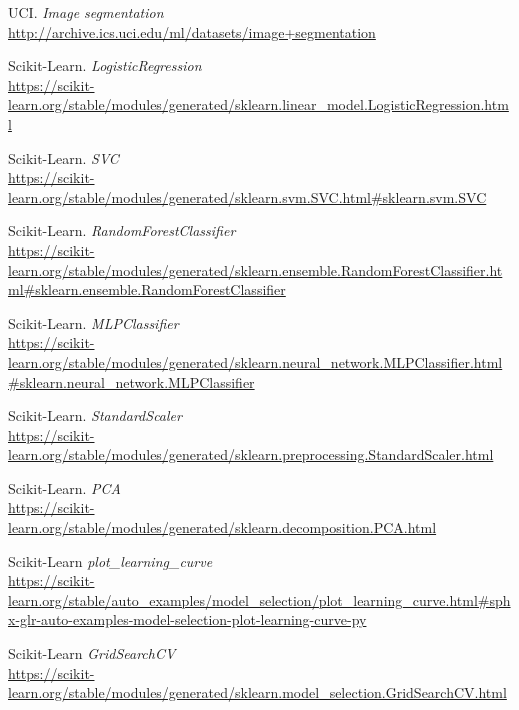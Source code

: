 \documentclass[11pt,a4paper]{article}
\begin{document}
\newpage

\begin{thebibliography}{20}

UCI. \textit{Image segmentation}
\\\url{http://archive.ics.uci.edu/ml/datasets/image+segmentation}

Scikit-Learn. \textit{LogisticRegression}
\\\url{https://scikit-learn.org/stable/modules/generated/sklearn.linear_model.LogisticRegression.html}

Scikit-Learn. \textit{SVC}
\\\url{https://scikit-learn.org/stable/modules/generated/sklearn.svm.SVC.html#sklearn.svm.SVC}

Scikit-Learn. \textit{RandomForestClassifier}
\\\url{https://scikit-learn.org/stable/modules/generated/sklearn.ensemble.RandomForestClassifier.html#sklearn.ensemble.RandomForestClassifier}

Scikit-Learn. \textit{MLPClassifier}
\\\url{https://scikit-learn.org/stable/modules/generated/sklearn.neural_network.MLPClassifier.html#sklearn.neural_network.MLPClassifier}

Scikit-Learn. \textit{StandardScaler}
\\\url{https://scikit-learn.org/stable/modules/generated/sklearn.preprocessing.StandardScaler.html}

Scikit-Learn. \textit{PCA}
\\\url{https://scikit-learn.org/stable/modules/generated/sklearn.decomposition.PCA.html}

Scikit-Learn \textit{plot\_learning\_curve}
\\\url{https://scikit-learn.org/stable/auto_examples/model_selection/plot_learning_curve.html#sphx-glr-auto-examples-model-selection-plot-learning-curve-py}

Scikit-Learn \textit{GridSearchCV}
\\\url{https://scikit-learn.org/stable/modules/generated/sklearn.model_selection.GridSearchCV.html}

\end{thebibliography}
\end{document}
